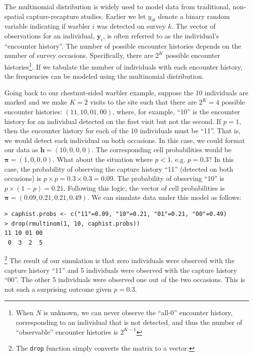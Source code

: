 The multinomial distribution is widely used to model data from traditional,
non-spatial capture-recapture studies.
Earlier we let $y_{ik}$ denote a binary random variable indicating if
warbler $i$ was detected on survey $k$. The vector of observations for an
individual, $\mathbf{y}_i$, is often referred to as the individual's
``encounter history''. The number of possible encounter
histories depends on the number of survey occasions. Specifically,
there are $2^K$
possible encounter histories\footnote{When $N$ is unknown, we can
  never observe the ``all-0'' encounter history, corresponding
to an individual that is not
  detected, and thus the number of ``observable'' encounter histories
  is $2^{K-1}$}.
If we tabulate the number of individuals with each encounter history,
the frequencies can be modeled using the multinomial
distribution. %

Going back to our
chestnut-sided warbler example, suppose the 10 individuals are marked
and we make $K=2$ visits to the site such that there are $2^K = 4$ possible encounter
histories: $(11, 10, 01, 00)$, where, for example,  ``10'' is the
encounter history for an individual detected on the first visit but not
the second. If $p=1$, then the
encounter history for each of the 10 individuals must  be ``11''. That
is, we would detect each individual on both occasions. In this case,
we could format our data as $\mathbf{h} = (10, 0, 0, 0)$. The
corresponding cell probabilities would be $\bm{\pi} = (1, 0, 0,
0)$. What about the situation where $p<1$, e.g. $p=0.3$? In this case, the
probability of observing the capture history ``11'' (detected on both
occasions) is $p \times p = 0.3 \times 0.3 = 0.09$. The probability of
observing ``10'' is $p \times (1-p) = 0.21$. Following this logic, the vector
of cell probabilities is $\bm{\pi} = (0.09, 0.21, 0.21, 0.49)$. We can
simulate data under this model as follows:
\begin{verbatim}
> caphist.probs <- c("11"=0.09, "10"=0.21, "01"=0.21, "00"=0.49)
> drop(rmultinom(1, 10, caphist.probs))
11 10 01 00
 0  3  2  5
\end{verbatim}\footnote{The \verb+drop+ function simply converts the matrix to a vector.}
The
result of our simulation is that zero individuals were observed with
the capture history ``11'' and 5 individuals were observed with the
capture history ``00''. The other 5 individuals were observed one out
of the two occasions. This is not such a surprising outcome given
$p=0.3$.


